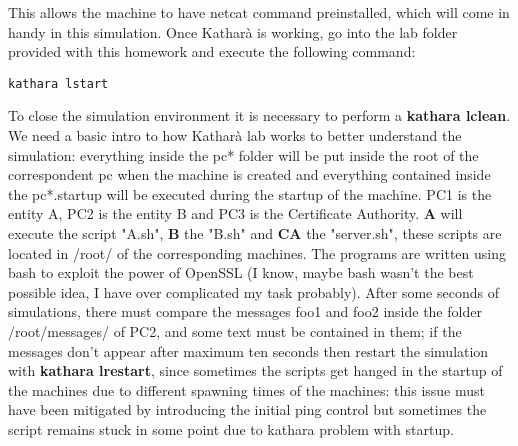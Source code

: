 \documentclass{article}
\begin{document}
This allows the machine to have netcat command preinstalled, which will come in handy in this simulation. Once Katharà is working, go into the lab folder provided with this homework and execute the following command:  

\begin{lstlisting}[breaklines]
kathara lstart
\end{lstlisting}

To close the simulation environment it is necessary to perform a \textbf{kathara lclean}. We need a basic intro to how Katharà lab works to better understand the simulation: everything inside the pc* folder will be put inside the root of the correspondent pc when the machine is created and everything contained inside the pc*.startup will be executed during the startup of the machine. PC1 is the entity A, PC2 is the entity B and PC3 is the Certificate Authority. \textbf{A} will execute the script "A.sh", \textbf{B} the "B.sh" and \textbf{CA} the "server.sh", these scripts are located in /root/ of the corresponding machines. The programs are written using bash to exploit the power of OpenSSL (I know, maybe bash wasn't the best possible idea, I have over complicated my task probably). After some seconds of simulations, there must compare the messages foo1 and foo2 inside the folder /root/messages/ of PC2, and some text must be contained in them; if the messages don't appear after maximum ten seconds then restart the simulation with \textbf{kathara lrestart}, since sometimes the scripts get hanged in the startup of the machines due to different spawning times of the machines: this issue must have been mitigated by introducing the initial ping control but sometimes the script remains stuck in some point due to kathara problem with startup.\newline
\end{document}
